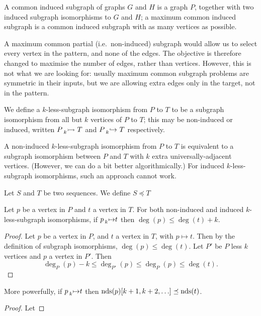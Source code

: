 \documentclass[letterpaper]{article}
\begin{document}
A common induced subgraph of graphs $G$ and $H$ is a graph $P$, together with two induced subgraph
isomorphisms to $G$ and $H$; a maximum common induced subgraph is a common induced subgraph with as
many vertices as possible.

A maximum common partial (i.e.\ non-induced) subgraph would allow us to select every vertex in the
pattern, and none of the edges. The objective is therefore changed to maximise the number of edges,
rather than vertices. However, this is not what we are looking for: usually maximum common subgraph
problems are symmetric in their inputs, but we are allowing extra edges only in the target, not in
the pattern.

We define a $k$-less-subgraph isomorphism from $P$ to $T$ to be a subgraph isomorphism from all
but $k$ vertices of $P$ to $T$; this may be non-induced or induced, written
$P \prescript{}{k}{\rightarrowtail}\  T$ and $P \prescript{}{k}{\hookrightarrow}\  T$ respectively.

A non-induced $k$-less-subgraph isomorphism from $P$ to $T$ is equivalent to a subgraph
isomorphism between $P$ and $T$ with $k$ extra universally-adjacent vertices. (However, we can do a
bit better algorithmically.) For induced $k$-less-subgraph isomorphisms, such an approach cannot
work.

Let $S$ and $T$ be two sequences. We define $S \preceq T$


\begin{proposition}
    Let $p$ be a vertex in $P$ and $t$ a vertex in $T$. For both non-induced and induced
    $k$-less-subgraph isomorphisms, if $p \prescript{}{k}{\mapsto} t$ then
    $\deg(p) \le \deg(t) + k$.
\end{proposition}
\begin{proof}
Let $p$ be a vertex in $P$, and $t$ a vertex in $T$, with $p\mapsto t$. Then by the definition of subgraph isomorphisms, $\deg(p) \le \deg(t)$. Let $P'$ be $P$ less $k$ vertices and $p$ a vertex in $P'$. Then
\[
\deg_{P}(p)-k \le \deg_{P'}(p) \le \deg_{P}(p) \le \deg(t).
\]
\end{proof}

\begin{proposition}
    More powerfully, if $p \prescript{}{k}{\mapsto} t$ then
    $\operatorname{nds}(p)[k+1, k+2, \ldots] \preceq \operatorname{nds}(t)$.
\end{proposition}

\begin{proof}
Let

\end{proof}
\end{document}
